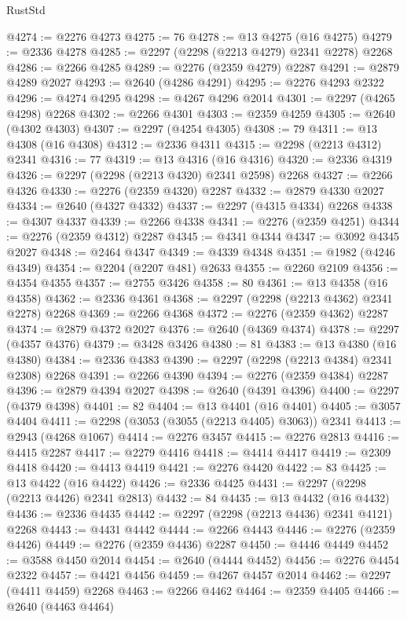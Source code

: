 \begin{lexlean}{RustStd}
\begin{coremodule}
{\begin{coremodule}
{{{{{{{{{{{{{{{{{{{{{{{{{{{{{{{{{{{{{{{{{{{{{{{{{{{{{{@4274 := @2276 @4273
@4275 := 76
@4278 := @13 @4275 (@16 @4275)
@4279 := @2336 @4278
@4285 := @2297 (@2298 (@2213 @4279) @2341 @2278) @2268
@4286 := @2266 @4285
@4289 := @2276 (@2359 @4279) @2287
@4291 := @2879 @4289 @2027
@4293 := @2640 (@4286 @4291)
@4295 := @2276 @4293 @2322
@4296 := @4274 @4295
@4298 := @4267 @4296 @2014
@4301 := @2297 (@4265 @4298) @2268
@4302 := @2266 @4301
@4303 := @2359 @4259
@4305 := @2640 (@4302 @4303)
@4307 := @2297 (@4254 @4305)
@4308 := 79
@4311 := @13 @4308 (@16 @4308)
@4312 := @2336 @4311
@4315 := @2298 (@2213 @4312) @2341
@4316 := 77
@4319 := @13 @4316 (@16 @4316)
@4320 := @2336 @4319
@4326 := @2297 (@2298 (@2213 @4320) @2341 @2598) @2268
@4327 := @2266 @4326
@4330 := @2276 (@2359 @4320) @2287
@4332 := @2879 @4330 @2027
@4334 := @2640 (@4327 @4332)
@4337 := @2297 (@4315 @4334) @2268
@4338 := @4307 @4337
@4339 := @2266 @4338
@4341 := @2276 (@2359 @4251)
@4344 := @2276 (@2359 @4312) @2287
@4345 := @4341 @4344
@4347 := @3092 @4345 @2027
@4348 := @2464 @4347
@4349 := @4339 @4348
@4351 := @1982 (@4246 @4349)
@4354 := @2204 (@2207 @481) @2633
@4355 := @2260 @2109
@4356 := @4354 @4355
@4357 := @2755 @3426
@4358 := 80
@4361 := @13 @4358 (@16 @4358)
@4362 := @2336 @4361
@4368 := @2297 (@2298 (@2213 @4362) @2341 @2278) @2268
@4369 := @2266 @4368
@4372 := @2276 (@2359 @4362) @2287
@4374 := @2879 @4372 @2027
@4376 := @2640 (@4369 @4374)
@4378 := @2297 (@4357 @4376)
@4379 := @3428 @3426
@4380 := 81
@4383 := @13 @4380 (@16 @4380)
@4384 := @2336 @4383
@4390 := @2297 (@2298 (@2213 @4384) @2341 @2308) @2268
@4391 := @2266 @4390
@4394 := @2276 (@2359 @4384) @2287
@4396 := @2879 @4394 @2027
@4398 := @2640 (@4391 @4396)
@4400 := @2297 (@4379 @4398)
@4401 := 82
@4404 := @13 @4401 (@16 @4401)
@4405 := @3057 @4404
@4411 := @2298 (@3053 (@3055 (@2213 @4405) @3063)) @2341
@4413 := @2943 (@4268 @1067)
@4414 := @2276 @3457
@4415 := @2276 @2813
@4416 := @4415 @2287
@4417 := @2279 @4416
@4418 := @4414 @4417
@4419 := @2309 @4418
@4420 := @4413 @4419
@4421 := @2276 @4420
@4422 := 83
@4425 := @13 @4422 (@16 @4422)
@4426 := @2336 @4425
@4431 := @2297 (@2298 (@2213 @4426) @2341 @2813)
@4432 := 84
@4435 := @13 @4432 (@16 @4432)
@4436 := @2336 @4435
@4442 := @2297 (@2298 (@2213 @4436) @2341 @4121) @2268
@4443 := @4431 @4442
@4444 := @2266 @4443
@4446 := @2276 (@2359 @4426)
@4449 := @2276 (@2359 @4436) @2287
@4450 := @4446 @4449
@4452 := @3588 @4450 @2014
@4454 := @2640 (@4444 @4452)
@4456 := @2276 @4454 @2322
@4457 := @4421 @4456
@4459 := @4267 @4457 @2014
@4462 := @2297 (@4411 @4459) @2268
@4463 := @2266 @4462
@4464 := @2359 @4405
@4466 := @2640 (@4463 @4464)
}}}}}}}}}}}}}}}}}}}}}}}}}}}}}}}}}}}}}}}}}}}}}}}}}}}}}}
\end{coremodule}}
\end{coremodule}
\end{lexlean}
